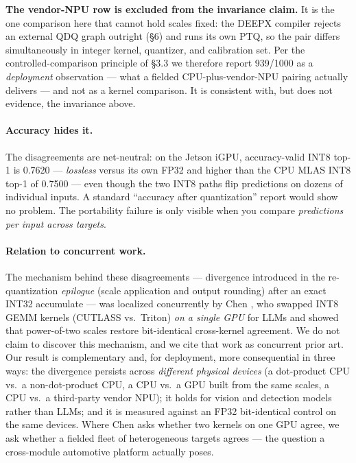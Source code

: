 \documentclass[11pt]{article}
\begin{document}
\textbf{The vendor-NPU row is excluded from the invariance claim.} It is the one comparison here that cannot hold scales fixed: the DEEPX compiler rejects an external QDQ graph outright (\S6) and runs its own PTQ, so the pair differs simultaneously in integer kernel, quantizer, and calibration set. Per the controlled-comparison principle of \S3.3 we therefore report 939/1000 as a \emph{deployment} observation --- what a fielded CPU-plus-vendor-NPU pairing actually delivers --- and not as a kernel comparison. It is consistent with, but does not evidence, the invariance above.

\paragraph{Accuracy hides it.}
The disagreements are net-neutral: on the Jetson iGPU, accuracy-valid INT8 top-1 is 0.7620 --- \emph{lossless} versus its own FP32 and higher than the CPU MLAS INT8 top-1 of 0.7500 --- even though the two INT8 paths flip predictions on dozens of individual inputs. A standard ``accuracy after quantization'' report would show no problem. The portability failure is only visible when you compare \emph{predictions per input across targets}.

\paragraph{Relation to concurrent work.}
The mechanism behind these disagreements --- divergence introduced in the re-quantization \emph{epilogue} (scale application and output rounding) after an exact INT32 accumulate --- was localized concurrently by Chen \citep{chen2026integeralibi, chen2026deterministic}, who swapped INT8 GEMM kernels (CUTLASS vs.\ Triton) \emph{on a single GPU} for LLMs and showed that power-of-two scales restore bit-identical cross-kernel agreement. We do not claim to discover this mechanism, and we cite that work as concurrent prior art. Our result is complementary and, for deployment, more consequential in three ways: the divergence persists across \emph{different physical devices} (a dot-product CPU vs.\ a non-dot-product CPU, a CPU vs.\ a GPU built from the same scales, a CPU vs.\ a third-party vendor NPU); it holds for vision and detection models rather than LLMs; and it is measured against an FP32 bit-identical control on the same devices. Where Chen asks whether two kernels on one GPU agree, we ask whether a fielded fleet of heterogeneous targets agrees --- the question a cross-module automotive platform actually poses.
\end{document}
